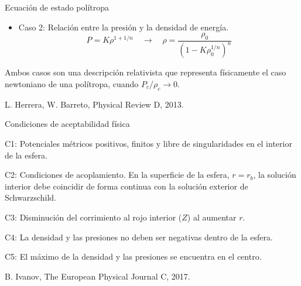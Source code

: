 \documentclass[handout,t]{beamer}
\begin{document}
\justifying

\begin{frame}{Ecuación de estado polítropa}
    \begin{itemize}   
    \item Caso 2: Relación entre la presión y la densidad de energía.
    \begin{equation*}
    \label{Poli2}
        P = K \rho^{1+1/n}  \quad  \longrightarrow  \quad  \rho = \frac{\rho_{0}}{\left(1 - K \rho_{0}^{1/n} \right)^{n}}
    \end{equation*}
    
    

\end{itemize}

\vspace{4mm}

Ambos casos son una descripción relativista que representa físicamente el caso newtoniano de una polítropa, cuando $P_{c} / \rho_{c} \rightarrow 0$.

\vspace{24mm}

\tiny \centering L. Herrera, W. Barreto, Physical Review D, 2013.
    
    
\end{frame}






\begin{frame}{Condiciones de aceptabilidad física}

\justifying

C1: Potenciales métricos positivos, finitos y libre de singularidades en el interior de la esfera.

\vspace{2mm}

C2: Condiciones de acoplamiento. En la superficie de la esfera, $r=r_{b}$, la solución interior debe coincidir de forma continua con la solución exterior de Schwarzschild.

\vspace{2mm}

C3: Disminución del corrimiento al rojo interior ($Z$) al aumentar $r$.

\vspace{2mm}

C4: La densidad y las presiones no deben ser negativas dentro de la esfera.

\vspace{2mm}

C5: El máximo de la densidad y las presiones se encuentra en el centro.

\vspace{4mm}
\centering
\tiny B. Ivanov, The European Physical Journal C, 2017.


\end{frame}
\end{document}

